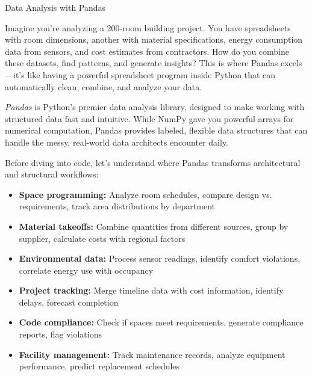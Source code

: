 
\h{Data Analysis with Pandas}

Imagine you're analyzing a 200-room building project. You have spreadsheets with room dimensions, another with material specifications, energy consumption data from sensors, and cost estimates from contractors. How do you combine these datasets, find patterns, and generate insights? This is where Pandas excels---it's like having a powerful spreadsheet program inside Python that can automatically clean, combine, and analyze your data.

\emph{Pandas} is Python's premier data analysis library, designed to make working with structured data fast and intuitive. While NumPy gave you powerful arrays for numerical computation, Pandas provides labeled, flexible data structures that can handle the messy, real-world data architects encounter daily.


Before diving into code, let's understand where Pandas transforms architectural and structural workflows:

\begin{itemize}
\item \textbf{Space programming:} Analyze room schedules, compare design vs. requirements, track area distributions by department
\item \textbf{Material takeoffs:} Combine quantities from different sources, group by supplier, calculate costs with regional factors
\item \textbf{Environmental data:} Process sensor readings, identify comfort violations, correlate energy use with occupancy
\item \textbf{Project tracking:} Merge timeline data with cost information, identify delays, forecast completion
\item \textbf{Code compliance:} Check if spaces meet requirements, generate compliance reports, flag violations
\item \textbf{Facility management:} Track maintenance records, analyze equipment performance, predict replacement schedules
\end{itemize}

